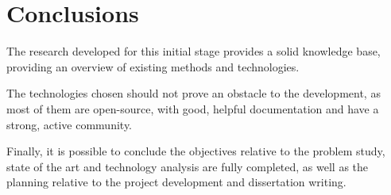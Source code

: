 \chapter{Conclusions}\label{chap:conclusions}

The research developed for this initial stage provides a solid knowledge base, providing an overview of existing methods and technologies.

The technologies chosen should not prove an obstacle to the development, as most of them are open-source, with good, helpful documentation and have a strong, active community.

Finally, it is possible to conclude the objectives relative to the problem study, state of the art and technology analysis are fully completed, as well as the planning relative to the project development and dissertation writing.

